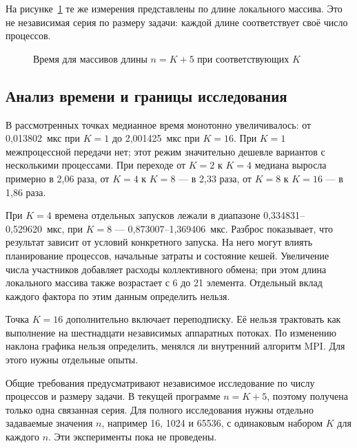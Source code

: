 \documentclass[14pt,a4paper]{extarticle}
\begin{document}
На рисунке~\ref{fig:time-size} те же измерения представлены по длине
локального массива. Это не независимая серия по размеру задачи:
каждой длине соответствует своё число процессов.

\begin{figure}[H]
\centering
{}
\caption{Время для массивов длины $n=K+5$ при соответствующих $K$}
\label{fig:time-size}
\end{figure}

\subsection{Анализ времени и границы исследования}

В рассмотренных точках медианное время монотонно увеличивалось:
от 0,013802~мкс при $K=1$ до 2,001425~мкс при $K=16$.
При $K=1$ межпроцессной передачи нет; этот режим значительно дешевле
вариантов с несколькими процессами. При переходе от $K=2$ к $K=4$
медиана выросла примерно в 2,06 раза, от $K=4$ к $K=8$ — в 2,33 раза,
от $K=8$ к $K=16$ — в 1,86 раза.

При $K=4$ времена отдельных запусков лежали в диапазоне
0,334831–0,529620~мкс, при $K=8$ — 0,873007–1,369406~мкс.
Разброс показывает, что результат зависит от условий конкретного запуска.
На него могут влиять планирование процессов, начальные затраты и состояние
кешей. Увеличение числа участников добавляет расходы коллективного обмена;
при этом длина локального массива также возрастает с 6 до 21 элемента.
Отдельный вклад каждого фактора по этим данным определить нельзя.

Точка $K=16$ дополнительно включает переподписку. Её нельзя трактовать
как выполнение на шестнадцати независимых аппаратных потоках.
По изменению наклона графика нельзя определить, менялся ли
внутренний алгоритм MPI. Для этого нужны отдельные опыты.

Общие требования предусматривают независимое исследование по числу
процессов и размеру задачи. В текущей программе $n=K+5$, поэтому
получена только одна связанная серия. Для полного исследования нужны
отдельно задаваемые значения $n$, например 16, 1024 и 65536,
с одинаковым набором $K$ для каждого $n$. Эти эксперименты пока не проведены.
\end{document}

